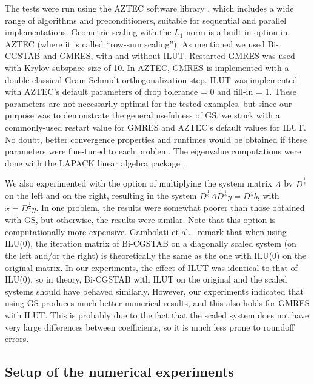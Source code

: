 \documentclass[12pt,a4paper]{article}
\newcounter{i}
\def\half{\scriptstyle \frac{1}{2}}
\begin{document}
The tests were run using the AZTEC software library \cite{Tuminaro99}, 
which includes a wide range of algorithms and preconditioners, suitable 
for sequential and parallel implementations.  Geometric scaling with 
the $L_1$-norm is a built-in option in AZTEC (where it is called 
``row-sum scaling'').  As mentioned we used Bi-CGSTAB and GMRES, 
with and without ILUT.  Restarted GMRES was used with Krylov 
subspace size of 10.  In AZTEC, GMRES is implemented with a double 
classical Gram-Schmidt orthogonalization step.  ILUT was implemented 
with AZTEC's default parameters of drop tolerance = 0 and fill-in = 1.  
These parameters are not necessarily optimal for the tested examples, 
but since our purpose was to demonstrate the general usefulness of GS, 
we stuck with a commonly-used restart value for GMRES and AZTEC's 
default values for ILUT.  No doubt, better convergence properties and 
runtimes would be obtained if these parameters were fine-tuned to each 
problem.  The eigenvalue computations were done with the LAPACK linear 
algebra package \cite{lapack}.

We also experimented with the option of multiplying the system 
matrix $A$ by $D^{\half}$ on the left and on the right, resulting 
in the system $D^{\half} A D^{\half} y = D^{\half} b$, with 
$x = D^{\half} y$.  In one problem, the results were somewhat
poorer than those obtained with GS, but otherwise, the results
were similar.  Note that this option is computationally more
expensive.
Gambolati et al.\ \cite{Gambolati03} remark that when using ILU(0),
the iteration matrix of Bi-CGSTAB on a diagonally scaled system
(on the left and/or the right) is theoretically the same as the
one with ILU(0) on the original matrix.  In our experiments, the
effect of ILUT was identical to that of ILU(0), so in theory, 
Bi-CGSTAB with ILUT on the original and the scaled systems should 
have behaved similarly.  However, our experiments indicated that 
using GS produces much better numerical results, and this also 
holds for GMRES with ILUT.  This is probably due to the fact that 
the scaled system does not have very large differences between 
coefficients, so it is much less prone to roundoff errors.




\subsection{Setup of the numerical experiments}
\label{setup}
\end{document}
